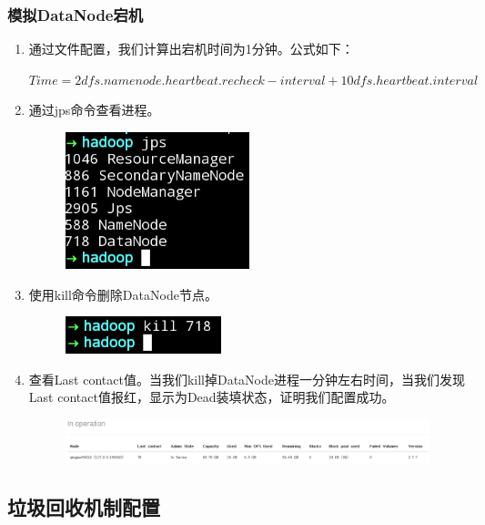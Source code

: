 \documentclass {article}
\begin{document}
			\subsubsection{模拟DataNode宕机}
				\begin{enumerate}
					\item 通过文件配置，我们计算出宕机时间为1分钟。公式如下：
					
					$Time=2dfs.namenode.heartbeat.recheck-interval+10dfs.heartbeat.interval$
					
					\item 通过jps命令查看进程。
					\begin{figure}[H]
						\centering
						\includegraphics{figures/fig9.png}
					\end{figure}
				
					\item 使用kill命令删除DataNode节点。
					\begin{figure}[H]
						\centering
						\includegraphics{figures/fig10.png}
					\end{figure}
				
					\item 查看Last contact值。当我们kill掉DataNode进程一分钟左右时间，当我们发现Last contact值报红，显示为Dead装填状态，证明我们配置成功。
					\begin{figure}[H]
						\centering
						\includegraphics[width=4.5in]{figures/fig10.5.jpg}
					\end{figure}
				\end{enumerate}
			
		\subsection{垃圾回收机制配置}
\end{document}
